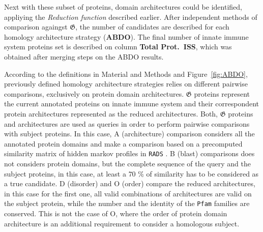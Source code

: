 \documentclass[11pt]{article}
\newcommand{\TODO}[1]{\begingroup\color{red}#1\endgroup}
\begin{document}
Next with these subset of proteins, domain architectures could be identified, appliying 
the \textsl{Reduction function} described earlier. After independent methods of comparison 
againgst $\boldsymbol{\mathfrak{G}}$, the number of candidates are described for 
each homology architecture strategy (\textbf{ABDO}). The final number of innate 
immune system proteins set is described on column \textbf{Total Prot.\ ISS}, which was 
obtained after merging steps on the ABDO results.

According to the definitions in Material and Methods and Figure~\ref{fig:ABDO}, 
previously defined homology architecture strategies relies on different pairwise 
comparisons, exclusively on protein domain architectures. $\boldsymbol{\mathfrak{G}}$
proteins represent the current annotated proteins on innate immune system and 
their correspondent protein architectures represented as the reduced architectures.
Both, $\boldsymbol{\mathfrak{G}}$ proteins and architectures are used as queries 
in order to perform pairwise comparisons with subject proteins. In this case, 
A (architecture) comparison considers all the annotated protein domains and make a 
comparison based on a precomputed similarity matrix of \TODO{hidden markov profiles} 
in \texttt{RADS} \cite{Terrapon:2014}. B (blast) comparisons does not considers protein 
domains, but the complete sequence of the query and the subject proteins, in this case, 
at least a $70$ \% of similarity has to be considered as a true candidate. D (disorder) 
and O (order) compare the reduced architectures, in this case for the first one, 
all valid combinations of architectures are valid on the subject protein, while the 
number and the identity of the \texttt{Pfam} families are conserved. This is not the case 
of O, where the order of protein domain architecture is an additional requirement to 
consider a homologous subject. 
\end{document}
